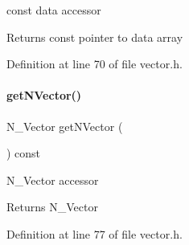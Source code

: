 const data accessor \begin{DoxyReturn}{Returns}
const pointer to data array 
\end{DoxyReturn}


Definition at line 70 of file vector.\+h.

\mbox{\label{classamici_1_1_ami_vector_acf288b105b2fa4520d0d73f828687533}} 
\paragraph{\texorpdfstring{get\+N\+Vector()}{getNVector()}}
{\footnotesize\ttfamily N\+\_\+\+Vector get\+N\+Vector (\begin{DoxyParamCaption}{ }\end{DoxyParamCaption}) const}

N\+\_\+\+Vector accessor \begin{DoxyReturn}{Returns}
N\+\_\+\+Vector 
\end{DoxyReturn}


Definition at line 77 of file vector.\+h.


